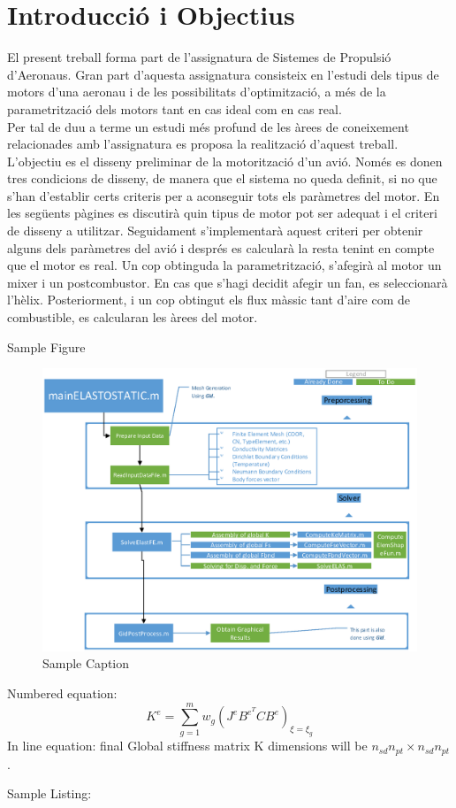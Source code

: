\section{Introducció i Objectius}
El present treball forma part de l'assignatura de Sistemes de Propulsió d'Aeronaus. Gran part d'aquesta assignatura consisteix en l'estudi dels tipus de motors d'una aeronau i de les possibilitats d'optimització, a més de la parametrització dels motors tant en cas ideal com en cas real.\\
Per tal de duu a terme un estudi més profund de les àrees de coneixement relacionades amb l'assignatura es proposa la realització d'aquest treball. L'objectiu es el disseny preliminar de la motorització d'un avió. Només es donen tres condicions de disseny, de manera que el sistema no queda definit, si no que s'han d'establir certs criteris per a aconseguir tots els paràmetres del motor. En les següents pàgines es discutirà quin tipus de motor pot ser adequat i el criteri de disseny a utilitzar. Seguidament s'implementarà aquest criteri per obtenir alguns dels paràmetres del avió i després es calcularà la resta tenint en compte que el motor es real. Un cop obtinguda la parametrització, s'afegirà al motor un mixer i un postcombustor. En cas que s'hagi decidit afegir un fan, es seleccionarà l'hèlix. Posteriorment, i un cop obtingut els flux màssic tant d'aire com de combustible, es calcularan les àrees del motor.    

Sample Figure
\begin{figure}[H]
	\centering
	\includegraphics[scale=0.9]{./pics/sample}
	\caption{Sample Caption}
\end{figure}
Numbered equation:
\begin{equation}
	K^e = \sum_{g=1}^{m}w_g (J^eB^{e^T}C B^e)_{\xi=\xi_g}
\end{equation}
In line equation:
final Global stiffness matrix K dimensions will be $n_{sd}n_{pt}\times n_{sd}n_{pt}$.

Sample Listing:
